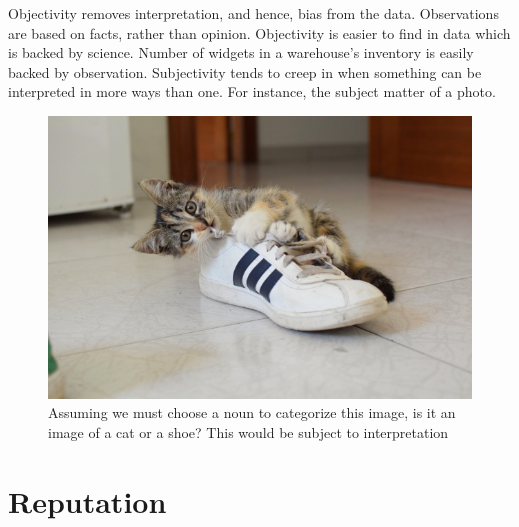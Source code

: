 Objectivity removes interpretation, and hence, bias from the data. Observations are based on facts, rather than opinion.
\cite{youtube} Objectivity is easier to find in data which is backed by science. Number of widgets in a warehouse's inventory is easily backed by observation. Subjectivity tends to creep in when something can be interpreted in more ways than one. For instance, the subject
matter of a photo. 

\begin{figure}[t]
  \includegraphics[scale=.25]{images/cat-shoe.jpg}
  \centering
  \caption{Assuming we must choose a noun to categorize this image, is it an image of a cat or a shoe? 
           This would be subject to interpretation}
\end{figure}

\section{Reputation}

\lipsum 
